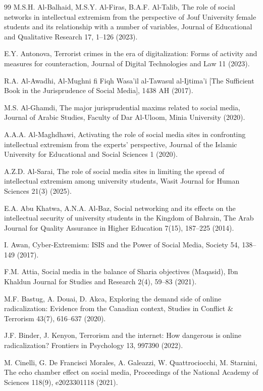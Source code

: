\documentclass[10pt]{NSP1}
\begin{document}
\begin{thebibliography}{99}
M.S.H. Al-Balhaid, M.S.Y. Al-Firas, B.A.F. Al-Talib, The role of social networks in intellectual extremism from the perspective of Jouf University female students and its relationship with a number of variables, Journal of Educational and Qualitative Research 17, 1–126 (2023).

E.Y. Antonova, Terrorist crimes in the era of digitalization: Forms of activity and measures for counteraction, Journal of Digital Technologies and Law 11 (2023).

R.A. Al-Awadhi, Al-Mughni fi Fiqh Wasa'il al-Tawasul al-Ijtima'i [The Sufficient Book in the Jurisprudence of Social Media], 1438 AH (2017).

M.S. Al-Ghamdi, The major jurisprudential maxims related to social media, Journal of Arabic Studies, Faculty of Dar Al-Uloom, Minia University (2020).

A.A.A. Al-Maghdhawi, Activating the role of social media sites in confronting intellectual extremism from the experts' perspective, Journal of the Islamic University for Educational and Social Sciences 1 (2020).

A.Z.D. Al-Sarai, The role of social media sites in limiting the spread of intellectual extremism among university students, Wasit Journal for Human Sciences 21(3) (2025).

E.A. Abu Khatwa, A.N.A. Al-Baz, Social networking and its effects on the intellectual security of university students in the Kingdom of Bahrain, The Arab Journal for Quality Assurance in Higher Education 7(15), 187–225 (2014).

I. Awan, Cyber-Extremism: ISIS and the Power of Social Media, Society 54, 138–149 (2017).

F.M. Attia, Social media in the balance of Sharia objectives (Maqasid), Ibn Khaldun Journal for Studies and Research 2(4), 59–83 (2021).

M.F. Bastug, A. Douai, D. Akca, Exploring the demand side of online radicalization: Evidence from the Canadian context, Studies in Conflict \& Terrorism 43(7), 616–637 (2020).

J.F. Binder, J. Kenyon, Terrorism and the internet: How dangerous is online radicalization? Frontiers in Psychology 13, 997390 (2022).

M. Cinelli, G. De Francisci Morales, A. Galeazzi, W. Quattrociocchi, M. Starnini, The echo chamber effect on social media, Proceedings of the National Academy of Sciences 118(9), e2023301118 (2021).


\end{thebibliography}
\end{document}

